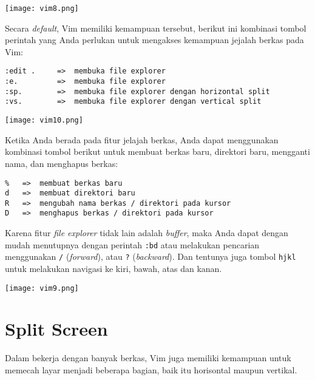 \documentclass{article}
\begin{document}
\vspace{12pt}

\texttt{[image: vim8.png]}

\vspace{12pt}

Secara \emph{default}, Vim memiliki kemampuan tersebut,
berikut ini kombinasi tombol perintah yang Anda perlukan
untuk mengakses kemampuan jejalah berkas pada Vim:

\begin{verbatim}
:edit .     =>  membuka file explorer
:e.         =>  membuka file explorer
:sp.        =>  membuka file explorer dengan horizontal split
:vs.        =>  membuka file explorer dengan vertical split
\end{verbatim}

\vspace{12pt}

\texttt{[image: vim10.png]}

\vspace{12pt}

Ketika Anda berada pada fitur jelajah berkas, Anda dapat
menggunakan kombinasi tombol berikut untuk membuat berkas
baru, direktori baru, mengganti nama, dan menghapus berkas:

\begin{verbatim}
%   =>  membuat berkas baru
d   =>  membuat direktori baru
R   =>  mengubah nama berkas / direktori pada kursor
D   =>  menghapus berkas / direktori pada kursor
\end{verbatim}

Karena fitur \emph{file explorer} tidak lain adalah
\emph{buffer}, maka Anda dapat dengan mudah menutupnya
dengan perintah \verb=:bd= atau melakukan pencarian
menggunakan \verb=/= (\emph{forward}), atau \verb=?=
(\emph{backward}). Dan tentunya juga tombol \verb=hjkl=
untuk melakukan navigasi ke kiri, bawah, atas dan kanan.

\vspace{12pt}

\texttt{[image: vim9.png]}

\vspace{12pt}

\section{Split Screen}
Dalam bekerja dengan banyak berkas, Vim juga memiliki
kemampuan untuk memecah layar menjadi beberapa bagian, baik
itu horisontal maupun vertikal.
\end{document}
